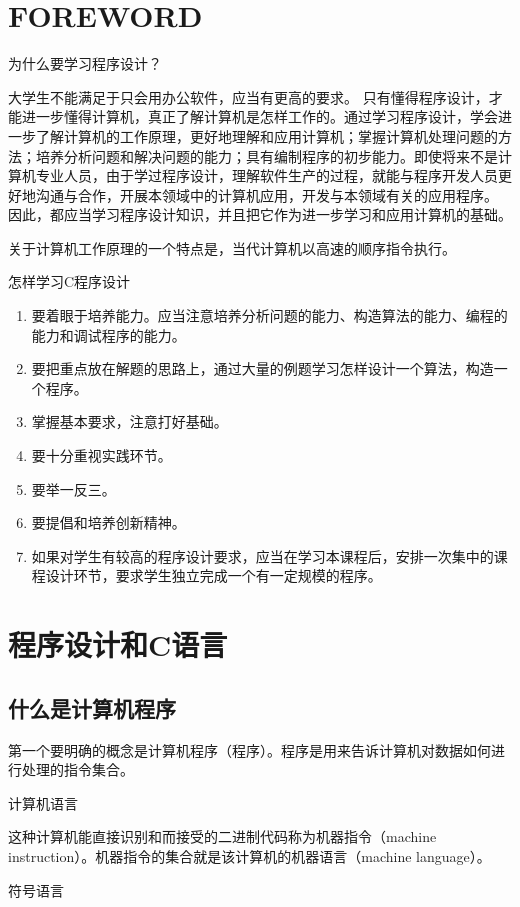 \chapter{FOREWORD}
为什么要学习程序设计？

大学生不能满足于只会用办公软件，应当有更高的要求。
只有懂得程序设计，才能进一步懂得计算机，真正了解计算机是怎样工作的。通过学习程序设计，学会进一步了解计算机的工作原理，更好地理解和应用计算机；掌握计算机处理问题的方法；培养分析问题和解决问题的能力；具有编制程序的初步能力。即使将来不是计算机专业人员，由于学过程序设计，理解软件生产的过程，就能与程序开发人员更好地沟通与合作，开展本领域中的计算机应用，开发与本领域有关的应用程序。
因此，都应当学习程序设计知识，并且把它作为进一步学习和应用计算机的基础。

关于计算机工作原理的一个特点是，当代计算机以高速的顺序指令执行。

怎样学习C程序设计
\begin{enumerate}
	\item 要着眼于培养能力。应当注意培养分析问题的能力、构造算法的能力、编程的能力和调试程序的能力。
	\item 要把重点放在解题的思路上，通过大量的例题学习怎样设计一个算法，构造一个程序。
	\item 掌握基本要求，注意打好基础。
	\item 要十分重视实践环节。
	\item 要举一反三。
	\item 要提倡和培养创新精神。
	\item 如果对学生有较高的程序设计要求，应当在学习本课程后，安排一次集中的课程设计环节，要求学生独立完成一个有一定规模的程序。
\end{enumerate}

\chapter{程序设计和C语言}

\section{什么是计算机程序}

第一个要明确的概念是计算机程序（程序）。程序是用来告诉计算机对数据如何进行处理的指令集合。

计算机语言

这种计算机能直接识别和而接受的二进制代码称为机器指令（machine instruction）。机器指令的集合就是该计算机的机器语言（machine language）。

符号语言


